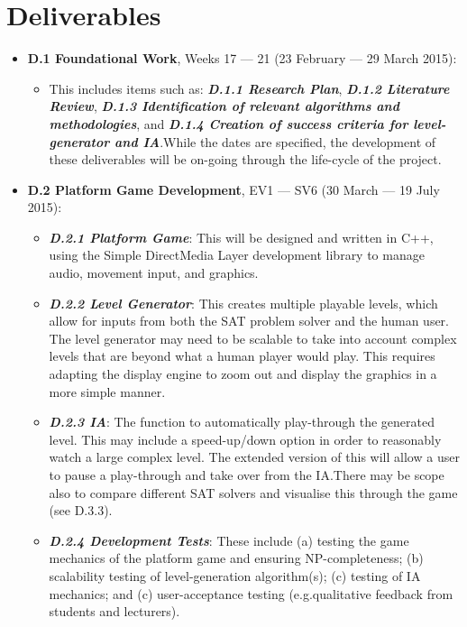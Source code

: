 \documentclass[a4paper]{article}
\begin{document}
\section{Deliverables} 
\vspace{-5mm}
\begin{itemize}
  \item \textbf{D.1 Foundational Work}, Weeks 17 --- 21 (23 February --- 29 March 2015):
    \begin{itemize} 
      \item This includes items such as: \textbf{\textit{D.1.1 Research Plan}}, \textbf{\textit{D.1.2 Literature Review}}, \textbf{\textit{D.1.3 Identification of relevant algorithms and methodologies}}, and \textbf{\textit{D.1.4 Creation of success criteria for level-generator and IA}}.\@ While the dates are specified, the development of these deliverables will be on-going through the life-cycle of the project.\@
    \end{itemize}
  \item \textbf{D.2 Platform Game Development}, EV1 --- SV6 (30 March --- 19 July 2015): 
    \begin{itemize} 
      \item \textbf{\textit{D.2.1 Platform Game}}: This will be designed and written in C++, using the Simple DirectMedia Layer development library to manage audio, movement input, and graphics.
      \item \textbf{\textit{D.2.2 Level Generator}}: This creates multiple playable levels, which allow for inputs from both the SAT problem solver and the human user. The level generator may need to be scalable to take into account complex levels that are beyond what a human player would play. This requires adapting the display engine to zoom out and display the graphics in a more simple manner. 
      \item \textbf{\textit{D.2.3 IA}}: The function to automatically play-through the generated level. This may include a speed-up/down option in order to reasonably watch a large complex level. The extended version of this will allow a user to pause a play-through and take over from the IA.\@ There may be scope also to compare different SAT solvers and visualise this through the game (see D.3.3). 
      \item \textbf{\textit{D.2.4 Development Tests}}: These include (a) testing the game mechanics of the platform game and ensuring NP-completeness; (b) scalability testing of level-generation algorithm(s); (c) testing of IA mechanics; and (c) user-acceptance testing (e.g.\@ qualitative feedback from students and lecturers).

\end{itemize}
\end{itemize}
\end{document}
